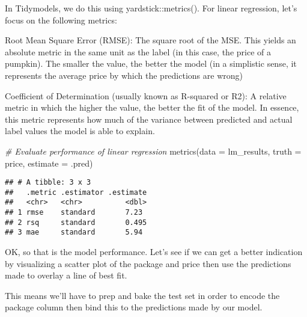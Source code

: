 \documentclass[
]{article}
\newenvironment{Shaded}{\begin{snugshade}}{\end{snugshade}}
\newcommand{\AttributeTok}[1]{\textcolor[rgb]{0.77,0.63,0.00}{#1}}
\newcommand{\CommentTok}[1]{\textcolor[rgb]{0.56,0.35,0.01}{\textit{#1}}}
\newcommand{\FunctionTok}[1]{\textcolor[rgb]{0.00,0.00,0.00}{#1}}
\newcommand{\NormalTok}[1]{#1}
\begin{document}
In Tidymodels, we do this using yardstick::metrics(). For linear
regression, let's focus on the following metrics:

Root Mean Square Error (RMSE): The square root of the MSE. This yields
an absolute metric in the same unit as the label (in this case, the
price of a pumpkin). The smaller the value, the better the model (in a
simplistic sense, it represents the average price by which the
predictions are wrong)

Coefficient of Determination (usually known as R-squared or R2): A
relative metric in which the higher the value, the better the fit of the
model. In essence, this metric represents how much of the variance
between predicted and actual label values the model is able to explain.

\begin{Shaded}
\begin{Highlighting}[]
\CommentTok{\# Evaluate performance of linear regression}
\FunctionTok{metrics}\NormalTok{(}\AttributeTok{data =}\NormalTok{ lm\_results,}
        \AttributeTok{truth =}\NormalTok{ price,}
        \AttributeTok{estimate =}\NormalTok{ .pred)}
\end{Highlighting}
\end{Shaded}

\begin{verbatim}
## # A tibble: 3 x 3
##   .metric .estimator .estimate
##   <chr>   <chr>          <dbl>
## 1 rmse    standard       7.23 
## 2 rsq     standard       0.495
## 3 mae     standard       5.94
\end{verbatim}

OK, so that is the model performance. Let's see if we can get a better
indication by visualizing a scatter plot of the package and price then
use the predictions made to overlay a line of best fit.

This means we'll have to prep and bake the test set in order to encode
the package column then bind this to the predictions made by our model.
\end{document}
